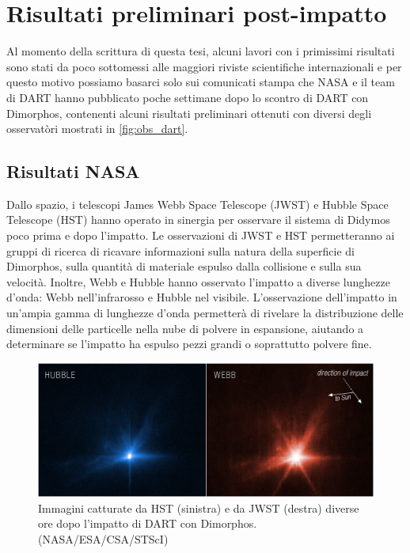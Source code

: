 \documentclass[a4paper,11pt,openright]{book}
\begin{document}
\chapter{Risultati preliminari post-impatto}\label{ch:ch_5}
Al momento della scrittura di questa tesi, alcuni lavori con i primissimi risultati sono stati da poco sottomessi alle maggiori riviste scientifiche internazionali e per questo motivo possiamo basarci solo sui comunicati stampa che NASA e il team di DART hanno pubblicato poche settimane dopo lo scontro di DART con Dimorphos, contenenti alcuni risultati preliminari ottenuti con diversi degli osservatòri mostrati in \cref{fig:obs_dart}. 

\section{Risultati NASA}
Dallo spazio, i telescopi James Webb Space Telescope (JWST) e Hubble Space Telescope (HST) hanno operato in sinergia per osservare il sistema di Didymos poco prima e dopo l'impatto. Le osservazioni di JWST e HST permetteranno ai gruppi di ricerca di ricavare informazioni sulla natura della superficie di Dimorphos, sulla quantità di materiale espulso dalla collisione e sulla sua velocità. Inoltre, Webb e Hubble hanno osservato l'impatto a diverse lunghezze d'onda: Webb nell'infrarosso e Hubble nel visibile. L'osservazione dell'impatto in un'ampia gamma di lunghezze d'onda permetterà di rivelare la distribuzione delle dimensioni delle particelle nella nube di polvere in espansione, aiutando a determinare se l'impatto ha espulso pezzi grandi o soprattutto polvere fine. 

\begin{figure}[!h]
    \centering
    \includegraphics[width=\textwidth]{figure/jwst_hst_impact.png}
    \caption[Immagini catturate da Hubble e da Webb diverse ore dopo l'impatto di DART con Dimorphos.]{Immagini catturate da HST (sinistra) e da JWST (destra) diverse ore dopo l'impatto di DART con Dimorphos. (NASA/ESA/CSA/STScI)}
    \label{fig:jwst_hst_impact}
\end{figure}
\end{document}
